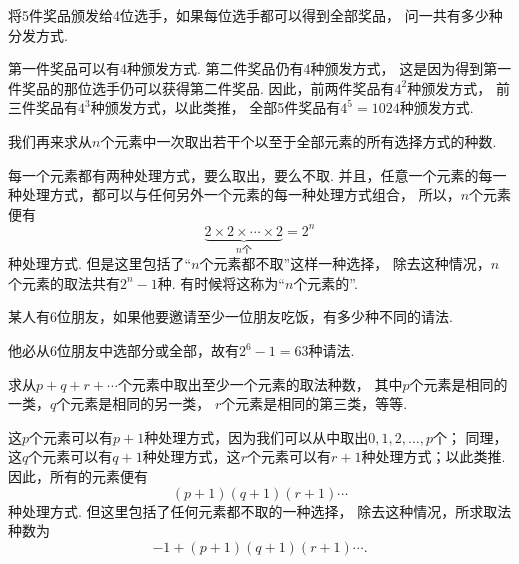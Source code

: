 \begin{example}
将5件奖品颁发给4位选手，如果每位选手都可以得到全部奖品，
问一共有多少种分发方式.
\begin{solution}
第一件奖品可以有4种颁发方式.
第二件奖品仍有4种颁发方式，
这是因为得到第一件奖品的那位选手仍可以获得第二件奖品.
因此，前两件奖品有\(4^2\)种颁发方式，
前三件奖品有\(4^3\)种颁发方式，以此类推，
全部5件奖品有\(4^5=1024\)种颁发方式.
\end{solution}
\end{example}

我们再来求从\(n\)个元素中一次取出若干个以至于全部元素的所有选择方式的种数.

每一个元素都有两种处理方式，要么取出，要么不取.
并且，任意一个元素的每一种处理方式，都可以与任何另外一个元素的每一种处理方式组合，
所以，\(n\)个元素便有\begin{equation*}
	\underbrace{2 \times 2 \times \dotsm \times 2}_{\text{$n$个}}
	= 2^n
\end{equation*}种处理方式.
但是这里包括了“\(n\)个元素都不取”这样一种选择，
除去这种情况，\(n\)个元素的取法共有\(2^n-1\)种.
有时候将这称为“\(n\)个元素的”.

\begin{example}
某人有6位朋友，如果他要邀请至少一位朋友吃饭，有多少种不同的请法.
\begin{solution}
他必从6位朋友中选部分或全部，故有\(2^6-1=63\)种请法.
\end{solution}
\end{example}

\begin{example}
求从\(p+q+r+\dotsb\)个元素中取出至少一个元素的取法种数，
其中\(p\)个元素是相同的一类，\(q\)个元素是相同的另一类，
\(r\)个元素是相同的第三类，等等.
\begin{solution}
这\(p\)个元素可以有\(p+1\)种处理方式，因为我们可以从中取出\(0,1,2,\dotsc,p\)个；
同理，这\(q\)个元素可以有\(q+1\)种处理方式，这\(r\)个元素可以有\(r+1\)种处理方式；以此类推.
因此，所有的元素便有\begin{equation*}
	(p+1)(q+1)(r+1)\dotsm
\end{equation*}种处理方式.
但这里包括了任何元素都不取的一种选择，
除去这种情况，所求取法种数为\begin{equation*}
	-1+(p+1)(q+1)(r+1)\dotsm.
\end{equation*}
\end{solution}
\end{example}

